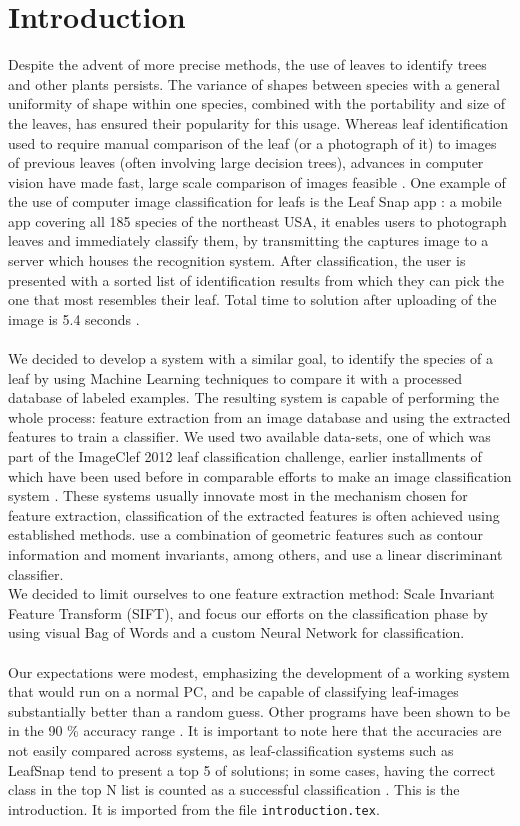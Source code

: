 \section{Introduction}
Despite the advent of more precise methods, the use of leaves to identify trees and other plants persists. The variance of shapes between species with a general uniformity of shape within one species, combined with the portability and size of the leaves, has ensured their popularity for this usage. 
Whereas leaf identification used to require manual comparison of the leaf (or a photograph of it) to images of previous leaves (often involving large decision trees), advances in computer vision have made fast, large scale comparison of images feasible \cite{Belh2008}. One example of the use of computer image classification for leafs is the Leaf Snap app \cite{Kuma2012}: a mobile app covering all 185 species of the northeast USA, it enables users to photograph leaves and immediately classify them, by transmitting the captures image to a server which houses the recognition system. After classification, the user is presented with a sorted list of identification results from which they can pick the one that most resembles their leaf. Total time to solution after uploading of the image is 5.4 seconds \cite{Kuma2012}.\\
\\
We decided to develop a system with a similar goal, to identify the species of a leaf by using Machine Learning techniques to compare it with a processed database of labeled examples. The resulting system is capable of performing the whole process: feature extraction from an image database and using the extracted features to train a classifier. We used two available data-sets, one of which was part of the ImageClef 2012 leaf classification challenge, earlier installments of which have been used before in comparable efforts to make an image classification system \cite{Goea2011}. These systems usually innovate most in the mechanism chosen for feature extraction, classification of the extracted features is often achieved using established methods. \cite{Kaly2015} use a combination of geometric features such as contour information and moment invariants, among others, and use a linear discriminant classifier.\\
We decided to limit ourselves to one feature extraction method: Scale Invariant Feature Transform (SIFT), and focus our efforts on the classification phase by using visual Bag of Words and a custom Neural Network for classification.\\
\\
Our expectations were modest, emphasizing the development of a working system that would run on a normal PC, and be capable of classifying leaf-images substantially better than a random guess. Other programs have been shown to be in the 90 \% accuracy range \cite{Wang2011, Kaly2015}. It is important to note here that the accuracies are not easily compared across systems, as leaf-classification systems such as LeafSnap tend to present a top 5 of solutions; in some cases, having the correct class in the top N
list is counted as a successful classification \cite{Wang2011}.
This is the introduction.
It is imported from the file \verb+introduction.tex+.

